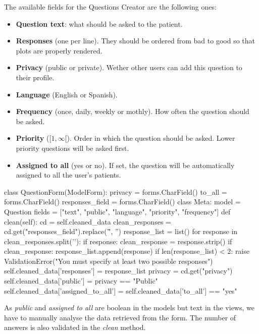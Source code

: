 \documentclass[12pt,english]{article}
\begin{document}
The available fields for the Questions Creator are the following ones:
\begin{itemize}
  \item \textbf{Question text}: what should be asked to the patient.
  \item \textbf{Responses} (one per line). They should be ordered from bad to good so that plots are properly rendered.
  \item \textbf{Privacy} (public or private). Wether other users can add this question to their profile.
  \item \textbf{Language} (English or Spanish).
  \item \textbf{Frequency} (once, daily, weekly or mothly). How often the question should be asked.
  \item \textbf{Priority} ($[1,\infty[$). Order in which the question should be asked. Lower priority questions will be asked first.
  \item \textbf{Assigned to all} (yes or no). If set, the question will be automatically assigned to all the user's patients.
\end{itemize}

\begin{python}[caption={Form to create or modify questions}, captionpos=b]
class QuestionForm(ModelForm):
    privacy = forms.CharField()
    to_all = forms.CharField()
    responses_field = forms.CharField()
    class Meta:
        model = Question
        fields = ["text", "public", "language", "priority", "frequency"]
    def clean(self):
        cd = self.cleaned_data
        clean_responses = cd.get("responses_field").replace('\r', '')
        response_list = list()
        for response in clean_responses.split('\n'):
            if response:
                clean_response = response.strip()
                if clean_response:
                    response_list.append(response)
        if len(response_list) < 2:
            raise ValidationError("You must specify at least two possible responses")
        self.cleaned_data['responses'] = response_list
        privacy = cd.get("privacy")
        self.cleaned_data['public'] = privacy == "Public"
        self.cleaned_data['assigned_to_all'] = self.cleaned_data['to_all'] == "yes"
\end{python}

As \emph{public} and \emph{assigned to all} are boolean in the models but text in the views, we have to manually analyse the data retrieved from the form. The number of answers is also validated in the \emph{clean} method.
\end{document}
